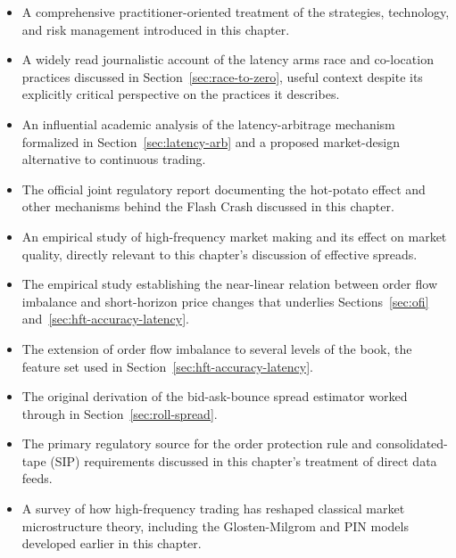 \documentclass[../ai_in_finance]{subfiles}
\begin{document}
\begin{itemize}
    \item {} A comprehensive practitioner-oriented treatment of the strategies, technology, and risk management introduced in this chapter.
    \item {} A widely read journalistic account of the latency arms race and co-location practices discussed in Section~\ref{sec:race-to-zero}, useful context despite its explicitly critical perspective on the practices it describes.
    \item {} An influential academic analysis of the latency-arbitrage mechanism formalized in Section~\ref{sec:latency-arb} and a proposed market-design alternative to continuous trading.
    \item {} The official joint regulatory report documenting the hot-potato effect and other mechanisms behind the Flash Crash discussed in this chapter.
    \item {} An empirical study of high-frequency market making and its effect on market quality, directly relevant to this chapter's discussion of effective spreads.
    \item {} The empirical study establishing the near-linear relation between order flow imbalance and short-horizon price changes that underlies Sections~\ref{sec:ofi} and~\ref{sec:hft-accuracy-latency}.
    \item {} The extension of order flow imbalance to several levels of the book, the feature set used in Section~\ref{sec:hft-accuracy-latency}.
    \item {} The original derivation of the bid-ask-bounce spread estimator worked through in Section~\ref{sec:roll-spread}.
    \item {} The primary regulatory source for the order protection rule and consolidated-tape (SIP) requirements discussed in this chapter's treatment of direct data feeds.
    \item {} A survey of how high-frequency trading has reshaped classical market microstructure theory, including the Glosten-Milgrom and PIN models developed earlier in this chapter.
\end{itemize}
\end{document}
